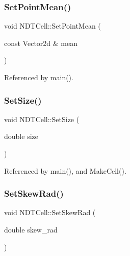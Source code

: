 \mbox{\label{classNDTCell_a3c3254891a543255f7beede3ed4c40b5}} 
\subsubsection{\texorpdfstring{Set\+Point\+Mean()}{SetPointMean()}}
{\footnotesize\ttfamily void N\+D\+T\+Cell\+::\+Set\+Point\+Mean (\begin{DoxyParamCaption}\item[{const Vector2d \&}]{mean }\end{DoxyParamCaption})\hspace{0.3cm}{\ttfamily [inline]}}



Referenced by main().

\mbox{\label{classNDTCell_a304509d07db69d380e60e474932ded1b}} 
\subsubsection{\texorpdfstring{Set\+Size()}{SetSize()}}
{\footnotesize\ttfamily void N\+D\+T\+Cell\+::\+Set\+Size (\begin{DoxyParamCaption}\item[{double}]{size }\end{DoxyParamCaption})\hspace{0.3cm}{\ttfamily [inline]}}



Referenced by main(), and Make\+Cell().

\mbox{\label{classNDTCell_aaa8e07701412d6c47e8d3f9172a4d86c}} 
\subsubsection{\texorpdfstring{Set\+Skew\+Rad()}{SetSkewRad()}}
{\footnotesize\ttfamily void N\+D\+T\+Cell\+::\+Set\+Skew\+Rad (\begin{DoxyParamCaption}\item[{double}]{skew\+\_\+rad }\end{DoxyParamCaption})\hspace{0.3cm}{\ttfamily [inline]}}


